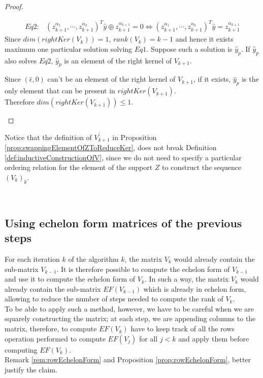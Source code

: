 \documentclass[11pt]{llncs}
\begin{document}
\begin{proof}
\begin{itemize}
\begin{itemize}
\begin{itemize}
\begin{align*}
                        Eq2: & (z_{k+1}^{\alpha_1}, \cdots, z_{k+1}^{\alpha_k})^T \hat{y} \oplus z_{k+1}^{\alpha_{k+1}} = 0 \iff (z_{k+1}^{\alpha_1}, \cdots, z_{k+1}^{\alpha_k})^T \hat{y} = z_{k+1}^{\alpha_{k+1}} 
                \end{align*}
                Since $dim(rightKer(V_k)) = 1$, $rank(V_k) = k-1$ and hence it exists maximum one particular solution solving $Eq1$. Suppose such a solution is $\hat{y}_p$. If $\hat{y}_p$ also solves $Eq2$, $\hat{y}_p$ is an element of the right kernel of $V_{k+1}$.
            \end{itemize}
            Since $(\hat{\epsilon}, 0)$ can't be an element of the right kernel of $V_{k+1}$, if it exists, $\hat{y}_p$ is the only element that can be present in $rightKer(V_{k+1})$.\\
            Therefore $dim\left(rightKer(V_{k+1})\right) \leq 1$.
        \end{itemize}
    \end{itemize} 
\end{proof}

\begin{remark}
    Notice that the definition of $V^{'}_{k+1}$ in Proposition \ref{prop:swappingElementOfZToReduceKer}, does not break Definition \ref{def:inductiveConstructionOfV}, since we do not need to specify a particular ordering relation for the element of the support $Z$ to construct the sequence $(V_{k})_k$.
\end{remark}

\\
\subsection{Using echelon form matrices of the previous steps}\label{subsubsection:optEchelonForm}
For each iteration $k$ of the algorithm $k$, the matrix $V_k$ would already contain the sub-matrix $V_{k-1}$. It is therefore possible to compute the echelon form of $V_{k-1}$ and use it to compute the echelon form of $V_{k}$. In such a way, the matrix $V_k$ would already contain the sub-matrix $EF(V_{k-1})$ which is already in echelon form, allowing to reduce the number of steps needed to compute the rank of $V_k$.\\
To be able to apply such a method, however, we have to be careful when we are squarely constructing the matrix; at each step, we are appending columns to the matrix, therefore, to compute $EF\left(V_k\right)$ have to keep track of all the rows operation performed to compute $EF\left(V_j\right)$ for all $j<k$ and apply them before computing $EF\left(V_k\right)$.\\
Remark \ref{rem:rowEchelonForm} and Proposition \ref{prop:rowEchelonForm}, better justify the claim.
\end{document}
